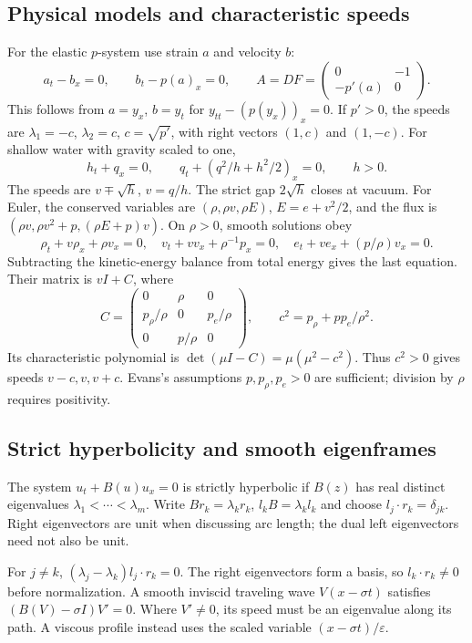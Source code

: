 \subsection{Physical models and characteristic speeds}
For the elastic $p$-system use strain $a$ and velocity $b$:
\[
 a_t-b_x=0,\qquad b_t-p(a)_x=0,\qquad
 A=DF=\begin{pmatrix}0&-1\\-p'(a)&0\end{pmatrix}.
\]
This follows from $a=y_x$, $b=y_t$ for
$y_{tt}-(p(y_x))_x=0$. If $p'>0$, the speeds are
$\lambda_1=-c$, $\lambda_2=c$, $c=\sqrt{p'}$, with right vectors
$(1,c)$ and $(1,-c)$.
For shallow water with gravity scaled to one,
\begin{equation}\label{eq:11-sw}
 h_t+q_x=0,\qquad q_t+(q^2/h+h^2/2)_x=0,\qquad h>0.
\end{equation}
The speeds are $v\mp\sqrt h$, $v=q/h$. The strict gap
$2\sqrt h$ closes at vacuum.
For Euler, the conserved variables are $(\rho,\rho v,\rho E)$,
$E=e+v^2/2$, and the flux is
$(\rho v,\rho v^2+p,(\rho E+p)v)$. On $\rho>0$, smooth solutions obey
\[
 \rho_t+v\rho_x+\rho v_x=0,\quad
 v_t+vv_x+\rho^{-1}p_x=0,\quad
 e_t+ve_x+(p/\rho)v_x=0.
\]
Subtracting the kinetic-energy balance from total energy gives the
last equation. Their matrix is $vI+C$, where
\[
 C=\begin{pmatrix}0&\rho&0\\p_\rho/\rho&0&p_e/\rho\\
 0&p/\rho&0\end{pmatrix},\qquad c^2=p_\rho+pp_e/\rho^2.
\]
Its characteristic polynomial is $\det(\mu I-C)=\mu(\mu^2-c^2)$.
Thus $c^2>0$ gives speeds $v-c,v,v+c$. Evans's assumptions
$p,p_\rho,p_e>0$ are sufficient; division by $\rho$ requires positivity.

\subsection{Strict hyperbolicity and smooth eigenframes}
\begin{definition}[Source \S11.1.2]
The system $u_t+B(u)u_x=0$ is strictly hyperbolic if $B(z)$ has
real distinct eigenvalues $\lambda_1<\cdots<\lambda_m$.
Write $Br_k=\lambda_k r_k$, $l_kB=\lambda_k l_k$ and choose
$l_j\cdot r_k=\delta_{jk}$. Right eigenvectors are unit when discussing
arc length; the dual left eigenvectors need not also be unit.
\end{definition}
For $j\ne k$, $(\lambda_j-\lambda_k)l_j\cdot r_k=0$.
The right eigenvectors form a basis, so $l_k\cdot r_k\ne0$ before
normalization. A smooth inviscid traveling wave $V(x-\sigma t)$
satisfies $(B(V)-\sigma I)V'=0$. Where $V'\ne0$, its speed must be
an eigenvalue along its path. A viscous profile instead uses the
scaled variable $(x-\sigma t)/\varepsilon$.

